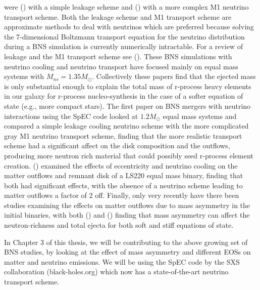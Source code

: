 were (\cite{neilsen2014magnetized, palenzuela2015effects}) with a simple leakage scheme and (\cite{sekiguchi2015dynamical}) with a more complex M1 neutrino transport scheme. Both the leakage scheme and M1 transport scheme are approximate methods to deal with neutrinos which are preferred because solving the 7-dimensional Boltzmann transport equation for the neutrino distribution during a BNS simulation is currently numerically intractable. For a review of leakage and the M1 transport scheme see (\cite{foucart2015post}). These BNS simulations with neutrino cooling and neutrino transport have focused mainly on equal mass systems with $M_{ns} = 1.35M_{\odot}$. Collectively these papers find that the ejected mass is only substantial  enough to explain the total mass of r-process heavy elements in our galaxy for r-process nucleo-synthesis in the case of a softer equation of state (e.g., more compact stars). The first paper on BNS mergers with neutrino interactions using the SpEC code looked at $1.2M_{\odot}$ equal mass systems and compared a simple leakage cooling neutrino scheme with the more complicated gray M1 neutrino transport scheme, finding that the more realistic transport scheme had a significant affect on the disk composition and the outflows, producing more neutron rich material that could possibly seed r-process element creation. (\cite{radice2016dynamical}) examined the effects of eccentricity and neutrino cooling on the matter outflows and remnant disk of a LS220 equal mass binary, finding that both had significant effects, with the absence of a neutrino scheme leading to matter outflows a factor of 2 off. Finally, only very recently have there been studies examining the effects on matter outflows due to mass asymmetry in the initial binaries, with both (\cite{lehner2016unequal}) and (\cite{sekiguchi2016dynamical}) finding that mass asymmetry can affect the neutron-richness and total ejecta for both soft and stiff equations of state.

In Chapter 3 of this thesis, we will be contributing to the above growing set of BNS studies, by looking at the effect of mass asymmetry and different EOSs on matter and neutrino emissions. We will be using the SpEC code by the SXS collaboration (black-holes.org) which now has a state-of-the-art neutrino transport scheme.


